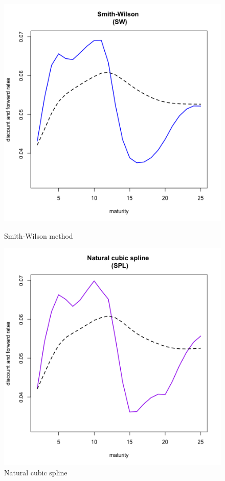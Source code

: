   \begin{figure}[!htb]
        \begin{minipage}{0.5\textwidth}
        \centering
        \includegraphics[width=1.06\linewidth, height=0.37\textheight]{gfx/chapter-yc-insurance/construction_graph3}
        \caption{Smith-Wilson method}
        \label{fig:andersen2010examples3}
    \end{minipage}
        \begin{minipage}{0.5\textwidth}
        \centering
        \includegraphics[width=1.06\linewidth, height=0.37\textheight]{gfx/chapter-yc-insurance/construction_graph4}
        \caption{Natural cubic spline}
        \label{fig:andersen2010examples4}
    \end{minipage}
\end{figure}

